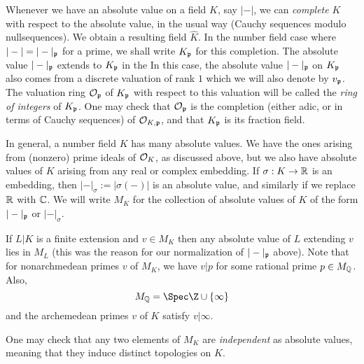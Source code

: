 Whenever we have an absolute value on a field $K$, say $|-|$, we can \emph{complete} $K$ with respect to the absolute value, in the usual way (Cauchy sequences modulo nullsequences).
We obtain a resulting field $\hat K$.
In the number field case where $|-| = |-|_{\mathfrak{p}}$ for a prime, we shall write $K_{\mathfrak{p}}$ for this completion.
The absolute value $|-|_{\mathfrak{p}}$ extends to $K_{\mathfrak{p}}$ in the 
In this case, the absolute value $|-|_{\mathfrak{p}}$ on $K_{\mathfrak{p}}$ also comes from a discrete valuation of rank $1$ which we will also denote by $v_{\mathfrak{p}}$.
The valuation ring $\mathcal{O}_{\mathfrak{p}}$ of $K_{\mathfrak{p}}$ with respect to this valuation will be called the \emph{ring of integers} of $K_{\mathfrak{p}}$.
One may check that $\mathcal{O}_{\mathfrak{p}}$ is the completion (either adic, or in terms of Cauchy sequences) of $\mathcal{O}_{K,\mathfrak{p}}$, and that $K_{\mathfrak{p}}$ is its fraction field.

In general, a number field $K$ has many absolute values.
We have the ones arising from (nonzero) prime ideals of $\mathcal{O}_{K}$, as discussed above, but we also have absolute values of $K$ arising from any real or complex embedding.
If $\sigma : K \to \mathbb{R}$ is an embedding, then $|-|_{\sigma} := |\sigma(-)|$ is an absolute value, and similarly if we replace $\mathbb{R}$ with $\mathbb{C}$.
We will write $M_{K}$ for the collection of absolute values of $K$ of the form $|-|_{\mathfrak{p}}$ or $|-|_{\sigma}$.

If $L|K$ is a finite extension and $v \in M_{K}$ then any absolute value of $L$ extending $v$ lies in $M_{L}$ (this was the reason for our normalization of $|-|_{\mathfrak{p}}$ above).
Note that for nonarchmedean primes $v$ of $M_{K}$, we have $v|p$ for some rational prime $p \in M_{\mathbb{Q}}$.
Also,
\[ M_{\Qbb} = \Spec \Z \cup \{\infty\} \]
and the archemedean primes $v$ of $K$ satisfy $v|\infty$.

One may check that any two elements of $M_{K}$ are \emph{independent} as absolute values, meaning that they induce distinct topologies on $K$.

